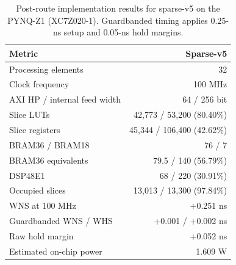 
\begin{table}[t]
  \centering
  \caption{Post-route implementation results for sparse-v5 on the PYNQ-Z1
  (XC7Z020-1). Guardbanded timing applies 0.25-ns setup and 0.05-ns hold
  margins.}
  \label{tab:sparse-v5-implementation}
  \begin{tabular}{@{}lr@{}}
    \toprule
    Metric & Sparse-v5 \\
    \midrule
    Processing elements & 32 \\
    Clock frequency & 100 MHz \\
    AXI HP / internal feed width & 64 / 256 bit \\
    Slice LUTs & 42,773 / 53,200 (80.40\%) \\
    Slice registers & 45,344 / 106,400 (42.62\%) \\
    BRAM36 / BRAM18 & 76 / 7 \\
    BRAM36 equivalents & 79.5 / 140 (56.79\%) \\
    DSP48E1 & 68 / 220 (30.91\%) \\
    Occupied slices & 13,013 / 13,300 (97.84\%) \\
    WNS at 100 MHz & +0.251 ns \\
    Guardbanded WNS / WHS & +0.001 / +0.002 ns \\
    Raw hold margin & +0.052 ns \\
    Estimated on-chip power & 1.609 W \\
    \bottomrule
  \end{tabular}
\end{table}

